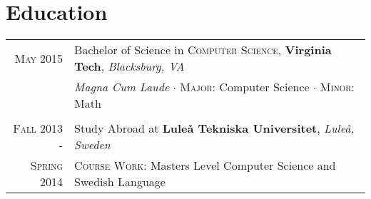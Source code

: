 \documentclass[letterpaper,10pt]{article}
\begin{document}
\section{Education}
\begin{tabular}{R|p{6.2in}}
	\textsc{May} 2015                & Bachelor of Science in \textsc{Computer Science}, \textbf{Virginia Tech}, \emph{Blacksburg, VA}    \\
	                                 & \small\emph{Magna Cum Laude} $\cdot$ \textsc{Major}: Computer Science $\cdot$ \textsc{Minor}: Math \\
	                                                                                                                  \\

	\textsc{Fall} 2013 -             & Study Abroad at \textbf{Luleå Tekniska Universitet}, \emph{Luleå, Sweden}                          \\
	\textsc{Spring} 2014\phantom{ -} & \small\textsc{Course Work}: Masters Level Computer Science and Swedish Language
\end{tabular}
\end{document}
